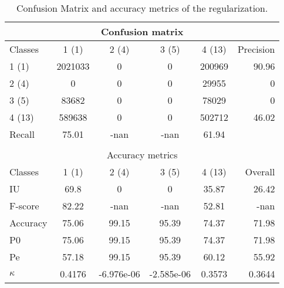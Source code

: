 \begin{table}
\begin{center}
\begin{tabular}{|l|c|c|c|c|r|}
\hline
\multicolumn{6}{|c|}{Confusion matrix} \\
\hline
 Classes & 1 (1) & 2 (4) & 3 (5) & 4 (13) & Precision \\
\hline
1 (1) & 2021033 & 0 & 0 & 200969 & 90.96 \\
\hline
2 (4) & 0 & 0 & 0 & 29955 & 0 \\
\hline
3 (5) & 83682 & 0 & 0 & 78029 & 0 \\
\hline
4 (13) & 589638 & 0 & 0 & 502712 & 46.02 \\
\hline
Recall & 75.01 & -nan & -nan & 61.94 &  \\
\hline
\multicolumn{6}{c}{ } \\
\hline
\multicolumn{6}{|c|}{Accuracy metrics} \\
\hline
 Classes & 1 (1) & 2 (4) & 3 (5) & 4 (13) & Overall \\
\hline
IU & 69.8 & 0 & 0 & 35.87 & 26.42 \\
\hline
F-score & 82.22 & -nan & -nan & 52.81 & -nan \\
\hline
Accuracy & 75.06 & 99.15 & 95.39 & 74.37 & 71.98 \\
\hline
P0 & 75.06 & 99.15 & 95.39 & 74.37 & 71.98 \\
\hline
Pe & 57.18 & 99.15 & 95.39 & 60.12 & 55.92 \\
\hline
$\kappa$ & 0.4176 & -6.976e-06 & -2.585e-06 & 0.3573 & 0.3644 \\
\hline
\end{tabular}
\caption{Confusion Matrix and accuracy metrics of the regularization.}
\end{center}
\end{table}
